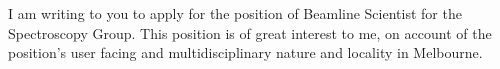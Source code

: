 \documentclass[10pt,a4paper,ragged2e,withhyper,paragraphstrue]{altacv}
\newcommand{\pind}{\hspace{24pt}}
\begin{document}



	\pind I am writing to you to apply for the position of Beamline Scientist for the Spectroscopy Group. This position is of great interest to me, on account of the position's user facing and multidisciplinary nature and locality in Melbourne. 
\end{document}
